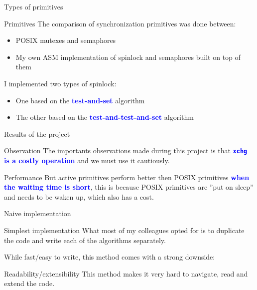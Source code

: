 \documentclass{beamer}
\newcommand{\textblue}[1]{\textbf{\textcolor{blue}{#1}}}
\begin{document}
\begin{frame}{Types of primitives}
  \begin{block}{Primitives}
    The comparison of synchronization primitives was done between:
    \begin{itemize}
            \item POSIX mutexes and semaphores
            \item My own ASM implementation of spinlock and semaphores built on top of them
    \end{itemize}
  \end{block}

  \bigskip

  I implemented two types of spinlock:

  \bigskip

  \begin{itemize}
    \item One based on the \textblue{test-and-set} algorithm
    \item The other based on the \textblue{test-and-test-and-set} algorithm
  \end{itemize}

\end{frame}

\begin{frame}{Results of the project}

  \begin{block}{Observation}
    The importants observations made during this project is that \textblue{\texttt{xchg} is a costly operation} and we must use it cautiously.
  \end{block}

  \bigskip

  \begin{block}{Performance}
    But active primitives perform better then POSIX primitives \textblue{when the waiting time is short}, this is because POSIX primitives are ''put on sleep'' and needs to be waken up, which also has a cost.
  \end{block}


\end{frame}


\begin{frame}{Naive implementation}

  \begin{block}{Simplest implementation}
    What most of my colleagues opted for is to duplicate the code and write each of the algorithms separately.
  \end{block}

  \bigskip

  While fast/easy to write, this method comes with a strong downside:

  \bigskip

  \begin{block}{Readability/extensibility}
    This method makes it very hard to navigate, read and extend the code.
  \end{block}

\end{frame}
\end{document}
